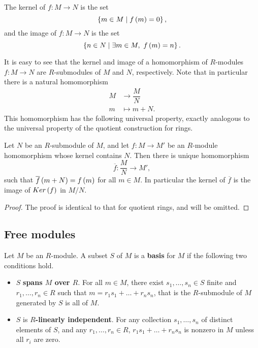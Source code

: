 \begin{definition}
The kernel of $ f : M \to N $ is the set
$$ \left\{ m \in M \mid f\left( m \right) = 0 \right\}, $$
and the image of $ f : M \to N $ is the set
$$ \left\{ n \in N \mid \exists m \in M, \ f\left( m \right) = n \right\}. $$
\end{definition}

It is easy to see that the kernel and image of a homomorphism of $ R $-modules $ f : M \to N $ are $ R $-submodules of $ M $ and $ N $, respectively. Note that in particular there is a natural homomorphism
\begin{align*}
M & \to \dfrac{M}{N} \\
m & \mapsto m + N.
\end{align*}
This homomorphism has the following universal property, exactly analogous to the universal property of the quotient construction for rings.

\begin{proposition}
Let $ N $ be an $ R $-submodule of $ M $, and let $ f : M \to M' $ be an $ R $-module homomorphism whose kernel contains $ N $. Then there is unique homomorphism
$$ \overline{f} : \dfrac{M}{N} \to M', $$
such that $ \overline{f}\left( m + N \right) = f\left( m \right) $ for all $ m \in M $. In particular the kernel of $ \overline{f} $ is the image of $ Ker\left( f \right) $ in $ M / N $.
\end{proposition}

\begin{proof}
The proof is identical to that for quotient rings, and will be omitted.
\end{proof}

\subsection{Free modules}

\begin{definition}
Let $ M $ be an $ R $-module. A subset $ S $ of $ M $ is a \textbf{basis} for $ M $ if the following two conditions hold.
\begin{itemize}
\item $ S $ \textbf{spans $ M $ over $ R $}. For all $ m \in M $, there exist $ s_1, \dots, s_n \in S $ finite and $ r_1, \dots, r_n \in R $ such that $ m = r_1s_1 + \dots + r_ns_n $, that is the $ R $-submodule of $ M $ generated by $ S $ is all of $ M $.
\item $ S $ is \textbf{$ R $-linearly independent}. For any collection $ s_1, \dots, s_n $ of distinct elements of $ S $, and any $ r_1, \dots, r_n \in R $, $ r_1s_1 + \dots + r_ns_n $ is nonzero in $ M $ unless all $ r_i $ are zero.
\end{itemize}
\end{definition}


